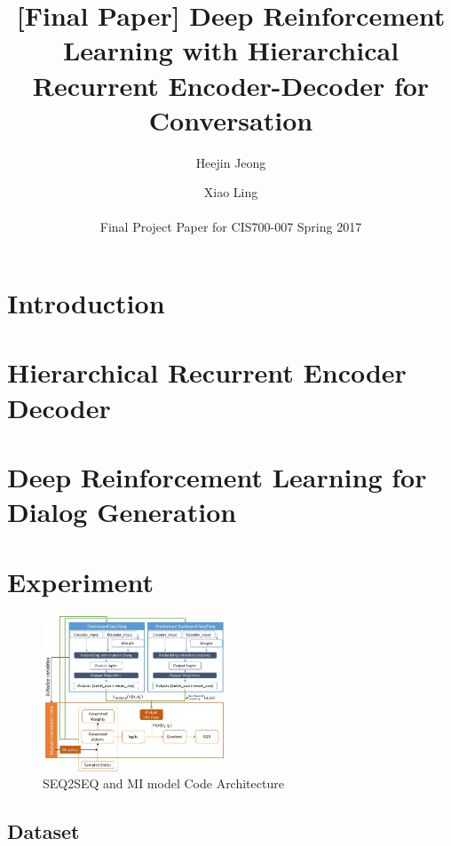 \documentclass[letterpaper]{article}
\begin{document}
%
\title{[Final Paper] Deep Reinforcement Learning with Hierarchical Recurrent Encoder-Decoder for Conversation }
\author{Heejin Jeong \and Xiao Ling \\ \\
  Final Project Paper for CIS700-007 Spring 2017\\}

\maketitle

\section{Introduction}


\section{Hierarchical Recurrent Encoder Decoder}


\section{Deep Reinforcement Learning for Dialog Generation}


\section{Experiment}

\begin{figure}[bt!]
    \centering
    \includegraphics[width=0.48\textwidth]{mi_architecture} 
    \caption{\small SEQ2SEQ and MI model Code Architecture}
    \label{fig:mi_architecture}
 \end{figure}

\subsection{Dataset}

\end{document}
